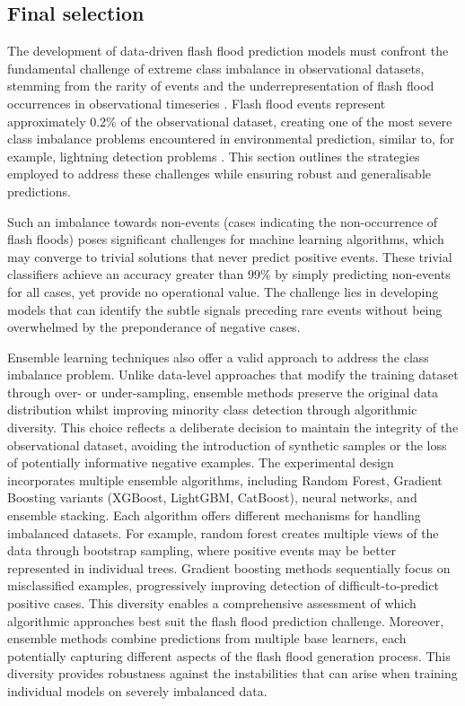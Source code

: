 \subsection{Final selection}


The development of data-driven flash flood prediction models must confront the fundamental challenge of extreme class imbalance in observational datasets, stemming from the rarity of events and the underrepresentation of flash flood occurrences in observational timeseries \citep{Gaume_2009, Panwar_2020, Marjerison_2016}. Flash flood events represent approximately 0.2\% of the observational dataset, creating one of the most severe class imbalance problems encountered in environmental prediction, similar to, for example, lightning detection problems \citep{Cavaiola_2024}. This section outlines the strategies employed to address these challenges while ensuring robust and generalisable predictions.

Such  an imbalance towards non-events (cases indicating the non-occurrence of flash floods) poses significant challenges for machine learning algorithms, which may converge to trivial solutions that never predict positive events. These trivial classifiers achieve an accuracy greater than 99\% by simply predicting non-events for all cases, yet provide no operational value. The challenge lies in developing models that can identify the subtle signals preceding rare events without being overwhelmed by the preponderance of negative cases.

Ensemble  learning techniques also offer a valid approach to address the class imbalance problem. Unlike data-level approaches that modify the training dataset through over- or under-sampling, ensemble methods preserve the original data distribution whilst improving minority class detection through algorithmic diversity. This choice reflects a deliberate decision to maintain the integrity of the observational dataset, avoiding the introduction of synthetic samples or the loss of potentially informative negative examples. The experimental design incorporates multiple ensemble algorithms, including Random Forest, Gradient Boosting variants (XGBoost, LightGBM, CatBoost), neural networks, and ensemble stacking. Each algorithm offers different mechanisms for handling imbalanced datasets. For example, random forest creates multiple views of the data through bootstrap sampling, where positive events may be better represented in individual trees. Gradient boosting methods sequentially focus on misclassified examples, progressively improving detection of difficult-to-predict positive cases. This diversity enables a comprehensive assessment of which algorithmic approaches best suit the flash flood prediction challenge. Moreover, ensemble methods combine predictions from multiple base learners, each potentially capturing different aspects of the flash flood generation process. This diversity provides robustness against the instabilities that can arise when training individual models on severely imbalanced data.



